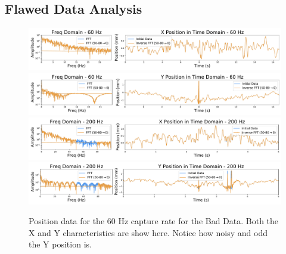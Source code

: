 \documentclass[12pt]{article}
\begin{document}
\subsection{Flawed Data Analysis}
\begin{figure}[!ht]
\centering
    \includegraphics[width=\textwidth]{data_33_x_pos.pdf}
    \includegraphics[width=\textwidth]{data_33_y_pos.pdf}
    \includegraphics[width=\textwidth]{data_36_x_pos.pdf}
    \includegraphics[width=\textwidth]{data_36_y_pos.pdf}
	\caption{Position data for the 60 Hz capture rate for the Bad Data. Both the X and Y characteristics are show here. Notice how noisy and odd the Y position is.}
    \label{fig:flawed_pos}    
\end{figure}
\end{document}
